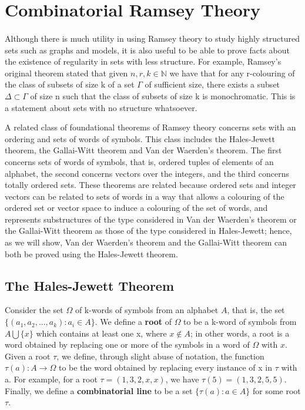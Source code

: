 \documentclass[11pt,a4paper]{article}
\begin{document}
\section{Combinatorial Ramsey Theory}


\paragraph*{}

Although there is much utility in using Ramsey theory to study highly structured sets such as graphs and models, it is also useful to be able to prove facts about the existence of regularity in sets with less structure. For example, Ramsey's original theorem stated that given $n, r, k \in \mathbb{N}$ we have that for any r-colouring of the class of subsets of size k of a set $\Gamma$ of sufficient size, there exists a subset $\Delta \subset \Gamma$ of size n such that the class of subsets of size  k is monochromatic. This is a statement about sets with no structure whatsoever.

A related class of foundational theorems of Ramsey theory concerns sets with an ordering and sets of words of symbols. This class includes the Hales-Jewett theorem, the Gallai-Witt theorem and Van der Waerden's theorem. The first concerns sets of words of symbols, that is, ordered tuples of elements of an alphabet, the second concerns vectors over the integers, and the third concerns totally ordered sets. These theorems are related because ordered sets and integer vectors can be related to sets of words in a way that allows a colouring of the ordered set or vector space to induce a colouring of the set of words, and represents substructures of the type considered in Van der Waerden's theorem or the Gallai-Witt theorem as those of the type considered in Hales-Jewett; hence, as we will show, Van der Waerden's theorem and the Gallai-Witt theorem can both be proved using the Hales-Jewett theorem.

\subsection{The Hales-Jewett Theorem}
Consider the set $\Omega$ of k-words of symbols from an alphabet $A$, that is, the set $\{(a_1, a_2, ..., a_k) : a_i \in A\}$. We define a \textbf{root} of $\Omega$ to be a k-word of symbols from $A \bigcup \{x\}$ which contains at least one x, where $x \notin A$; in other words, a root is a word obtained by replacing one or more of the symbols in a word of $\Omega$ with $x$. Given a root $\tau$, we define, through slight abuse of notation, the function $\tau (a): A \rightarrow \Omega$ to be the word obtained by replacing every instance of x in $\tau$ with a. For example, for a root $\tau = (1, 3, 2, x, x)$, we have $\tau (5) = (1, 3, 2, 5, 5)$. Finally, we define a \textbf{combinatorial line} to be a set $\{\tau(a) : a \in A\}$ for some root $\tau$.
\end{document}
